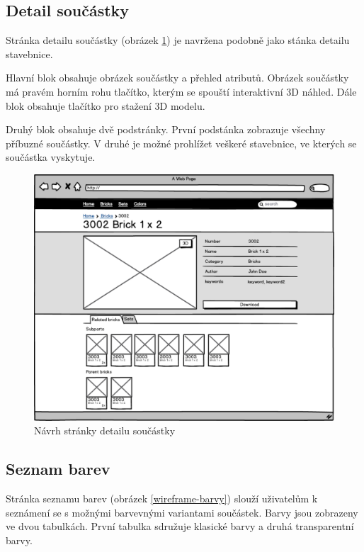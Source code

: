 \subsection{Detail součástky}
Stránka detailu součástky (obrázek \ref{wireframe-soucastka-detail}) je navržena podobně jako stánka detailu stavebnice. 

Hlavní blok obsahuje obrázek součástky a přehled atributů. Obrázek součástky má pravém horním rohu tlačítko, kterým se spouští interaktivní 3D náhled. Dále blok obsahuje tlačítko pro stažení 3D modelu. 

Druhý blok obsahuje dvě podstránky. První podstánka zobrazuje všechny příbuzné součástky. V druhé je možné prohlížet veškeré stavebnice, ve kterých se součástka vyskytuje.

\begin{figure}[htbp]
    \centering
    \includegraphics[width=\textwidth,height=\textheight,keepaspectratio]{pdfs/wireframe_brick.pdf}
    \caption{Návrh stránky detailu součástky}\label{wireframe-soucastka-detail}
\end{figure}

\subsection{Seznam barev}
Stránka seznamu barev (obrázek \ref{wireframe-barvy}) slouží uživatelům k seznámení se s možnými barvevnými variantami součástek. Barvy jsou zobrazeny ve dvou tabulkách. První tabulka sdružuje klasické barvy a druhá transparentní barvy. 

